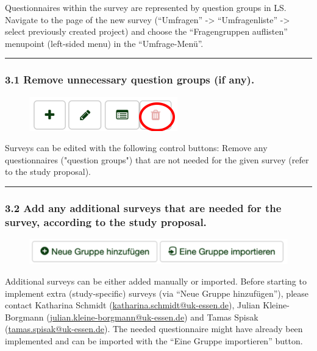 Questionnaires within the survey are represented by question groups in LS.
Navigate to the page of the new survey (“Umfragen” -> “Umfragenliste” -> select previously created project) and choose the “Fragengruppen auflisten” menupoint (left-sided menu) in the “Umfrage-Menü”.

\par\noindent\rule{\textwidth\color{pniblue}}{0.4pt}
\subsubsection*{3.1 Remove unnecessary question groups (if any).}
\begin{figure}
\centering
\includegraphics{docs/fig/ls_sop3.1.png}
\end{figure}

Surveys can be edited with the following control buttons: 
Remove any questionnaires ("question groups") that are not needed for the given survey (refer to the study proposal).

\par\noindent\rule{\textwidth\color{pniblue}}{0.4pt}
\subsubsection*{3.2 Add any additional surveys that are needed for the survey, according to the study proposal.}

\begin{figure}
\centering
\includegraphics{docs/fig/ls_sop3.2.png}
\end{figure}

Additional surveys can be either added manually or imported.
Before starting to implement extra (study-specific) surveys (via “Neue Gruppe hinzufügen”), please contact Katharina Schmidt (\href{mailto:katharina.schmidt@uk-essen.de}{katharina.schmidt@uk-essen.de}),  Julian Kleine-Borgmann (\href{mailto:julian.kleine-borgmann@uk-essen.de}{julian.kleine-borgmann@uk-essen.de}) and Tamas Spisak (\href{mailto:tamas.spisak@uk-essen.de}{tamas.spisak@uk-essen.de}). The needed questionnaire might have already been implemented and can be imported with the “Eine Gruppe importieren” button.

